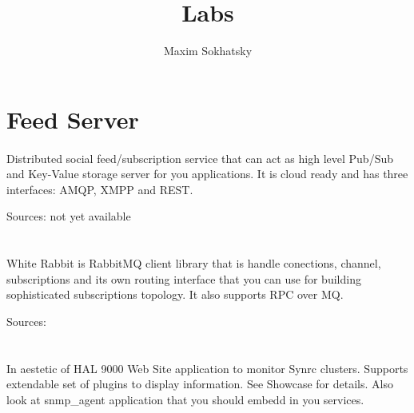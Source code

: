 \documentclass[11pt]{article}
\begin{document}
\title{Labs}
\author{Maxim Sokhatsky}


\section*{Feed Server}
\paragraph{}
Distributed social feed/subscription service that can act as high level Pub/Sub
and Key-Value storage server for you applications. It is cloud ready and has
three interfaces: AMQP, XMPP and REST.

Sources: not yet available

\section*{}
\paragraph{}
White Rabbit is RabbitMQ client library that is handle conections, channel,
subscriptions and its own routing interface that you can use for building
sophisticated subscriptions topology. It also supports RPC over MQ.

Sources: 

\section*{}
\paragraph{}
In aestetic of HAL 9000 Web Site application to monitor Synrc clusters.
Supports extendable set of plugins to display information. See Showcase for details.
Also look at snmp_agent application that you should embedd in you services.
\end{document}
